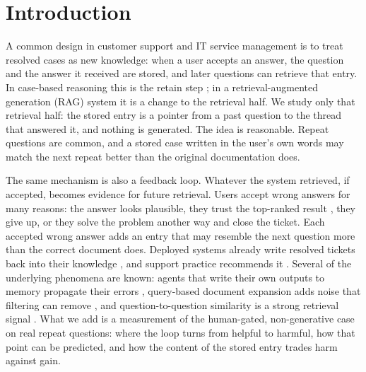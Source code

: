\documentclass[11pt]{article}
\begin{document}
\section{Introduction}
A common design in customer support and IT service management is to treat resolved cases as new knowledge: when a user accepts an answer, the question and the answer it received are stored, and later questions can retrieve that entry. In case-based reasoning this is the retain step \citep{aamodt1994cbr}; in a retrieval-augmented generation (RAG) system \citep{lewis2020rag} it is a change to the retrieval half. We study only that retrieval half: the stored entry is a pointer from a past question to the thread that answered it, and nothing is generated. The idea is reasonable. Repeat questions are common, and a stored case written in the user's own words may match the next repeat better than the original documentation does.

The same mechanism is also a feedback loop. Whatever the system retrieved, if accepted, becomes evidence for future retrieval. Users accept wrong answers for many reasons: the answer looks plausible, they trust the top-ranked result \citep{joachims2005accurately,joachims2007evaluating}, they give up, or they solve the problem another way and close the ticket. Each accepted wrong answer adds an entry that may resemble the next question more than the correct document does. Deployed systems already write resolved tickets back into their knowledge \citep{liu2026vigil,wang2026linkedin,omrag2026}, and support practice recommends it \citep{kcs}. Several of the underlying phenomena are known: agents that write their own outputs to memory propagate their errors \citep{xiong2025memory}, query-based document expansion adds noise that filtering can remove \citep{gospodinov2023doc2queryminus}, and question-to-question similarity is a strong retrieval signal \citep{jeon2005finding,sakata2019faq}. What we add is a measurement of the human-gated, non-generative case on real repeat questions: where the loop turns from helpful to harmful, how that point can be predicted, and how the content of the stored entry trades harm against gain.
\end{document}
